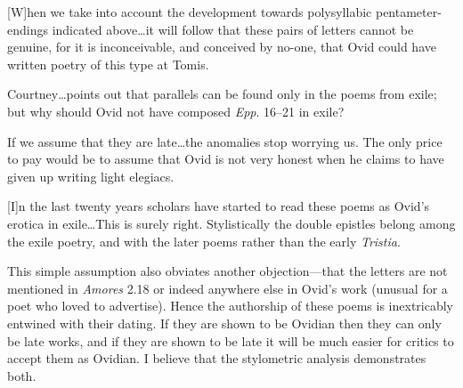 \documentclass[twocolumn, switch, a4paper]{article} %
\begin{document}
\begin{adjustwidth}{0.07\linewidth}{0.07\linewidth}
\footnotesize%
[W]hen we take into account the development towards polysyllabic
pentameter-endings indicated above\dots it will follow that these pairs of
letters cannot be genuine, for it is inconceivable, and conceived by no-one,
that Ovid could have written poetry of this type at Tomis.
\begin{flushright}
\cite[64]{courtney_65}
\end{flushright}
\end{adjustwidth}

\begin{adjustwidth}{0.07\linewidth}{0.07\linewidth}
\footnotesize%
Courtney\dots points out that parallels can be found only in the poems from
exile; but why should Ovid not have composed \emph{Epp}. 16--21 in exile?
\begin{flushright}
\cite[330 n. 1]{reeve_heroides}
\end{flushright}
\end{adjustwidth}

\begin{adjustwidth}{0.07\linewidth}{0.07\linewidth}
\footnotesize%
If we assume that they are late\dots the anomalies stop worrying us. The only
price to pay would be to assume that Ovid is not very honest when he claims to
have given up writing light elegiacs.
\begin{flushright}
\cite{barchiesi1996review}
\end{flushright}
\end{adjustwidth}

\begin{adjustwidth}{0.07\linewidth}{0.07\linewidth}
\footnotesize%
[I]n the last twenty years scholars have started to read these poems as Ovid's
erotica in exile\dots This is surely right. Stylistically the double epistles
belong among the exile poetry, and with the later poems rather than the early
\emph{Tristia}.
\begin{flushright}
\cite[144--5]{heyworth_16}
\end{flushright}
\end{adjustwidth}

This simple assumption also obviates another objection---that the letters are
not mentioned in \emph{Amores} 2.18 or indeed anywhere else in Ovid's work
(unusual for a poet who loved to advertise). Hence the authorship of these
poems is inextricably entwined with their dating. If they are shown to be
Ovidian then they can only be late works, and if they are shown to be late it
will be much easier for critics to accept them as Ovidian. I believe that the
stylometric analysis demonstrates both.
\end{document}

